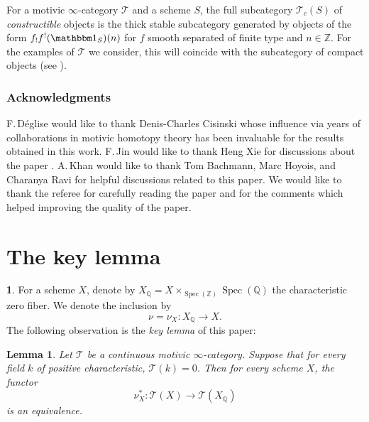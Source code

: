 \documentclass[JEP,XML,SOM,Unicode]{cedram}
\newcommand{\T}{\mathscr T}
\newcommand{\un}{\mathbbm 1}
\DeclareMathOperator{\spec}{Spec}
\newcommand{\ZZ} {\mathbb Z}
\newcommand{\QQ} {\mathbb Q}
\newtheorem{lm}[thm]{Lemma}
\theoremstyle{remark}
\theoremstyle{definition}
\newtheorem{num}[thm]{}
\numberwithin{equation}{thm}
\begin{document}
For a motivic $\infty$-category $\T$ and a scheme $S$, the full subcategory $\T_c(S)$ of \emph{constructible} objects is the thick stable subcategory generated by objects of the form $f_!f^!(\un_S)(n)$ for $f$ smooth separated of finite type and $n \in \ZZ$.
For the examples of $\T$ we consider, this will coincide with the subcategory of compact objects (see \cite[Prop.\,1.4.11]{CD3}).

\subsubsection*{Acknowledgments}
F.\,Déglise would like to thank Denis-Charles Cisinski whose influence via years of collaborations in motivic homotopy theory
has been invaluable for the results obtained in this work.
F.\,Jin would like to thank Heng Xie for discussions about the paper \cite{Jacobson}.
A.\,Khan would like to thank Tom Bachmann, Marc Hoyois, and Charanya Ravi for helpful discussions related to this paper. We would like to thank the referee for carefully reading the paper and for the comments which helped improving the quality of the paper.

\section{The key lemma}
\label{sec:key}

\begin{num}\label{num:zero_part}
For a scheme $X$, denote by $X_\QQ = X\times_{\spec(\ZZ)}\spec(\QQ)$ the characteristic zero fiber.
We denote the inclusion by
\begin{equation*}
\nu = \nu_X : X_\QQ \to X.
\end{equation*}
The following observation is the \textit{key lemma} of this paper:
\end{num}

\begin{lm}
\label{lm:fiber_Q_eq}
Let $\T$ be a continuous motivic $\infty$-category.
Suppose that for every field $k$ of positive characteristic, $\T(k)=0$.
Then for every scheme $X$, the functor
\[
\nu_X^*:\T(X)\to\T(X_\QQ)
\]
is an equivalence.
\end{lm}
\end{document}
